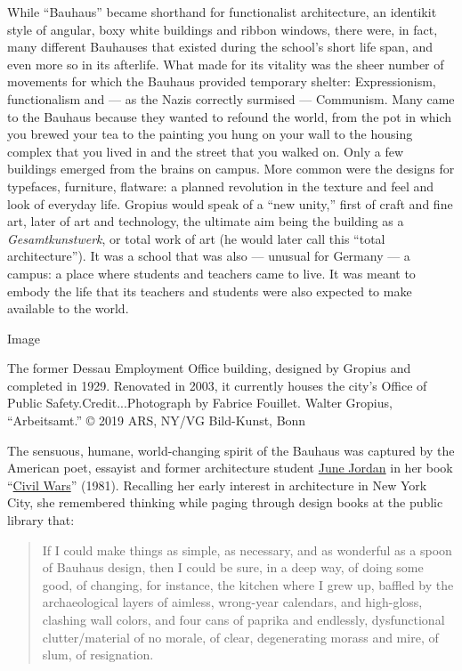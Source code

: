 While ``Bauhaus'' became shorthand for functionalist architecture, an
identikit style of angular, boxy white buildings and ribbon windows,
there were, in fact, many different Bauhauses that existed during the
school's short life span, and even more so in its afterlife. What made
for its vitality was the sheer number of movements for which the Bauhaus
provided temporary shelter: Expressionism, functionalism and --- as the
Nazis correctly surmised --- Communism. Many came to the Bauhaus because
they wanted to refound the world, from the pot in which you brewed your
tea to the painting you hung on your wall to the housing complex that
you lived in and the street that you walked on. Only a few buildings
emerged from the brains on campus. More common were the designs for
typefaces, furniture, flatware: a planned revolution in the texture and
feel and look of everyday life. Gropius would speak of a ``new unity,''
first of craft and fine art, later of art and technology, the ultimate
aim being the building as a \emph{Gesamtkunstwerk}, or total work of art
(he would later call this ``total architecture''). It was a school that
was also --- unusual for Germany --- a campus: a place where students
and teachers came to live. It was meant to embody the life that its
teachers and students were also expected to make available to the world.

Image

The former Dessau Employment Office building, designed by Gropius and
completed in 1929. Renovated in 2003, it currently houses the city's
Office of Public Safety.Credit...Photograph by Fabrice Fouillet. Walter
Gropius, ``Arbeitsamt.'' © 2019 ARS, NY/VG Bild-Kunst, Bonn

The sensuous, humane, world-changing spirit of the Bauhaus was captured
by the American poet, essayist and former architecture student
\href{https://www.nytimes3xbfgragh.onion/2002/06/18/arts/june-jordan-65-poet-and-political-activist.html}{June
Jordan} in her book
``\href{https://www.nytimes3xbfgragh.onion/1981/08/09/books/opinions-and-poems.html}{Civil
Wars}'' (1981). Recalling her early interest in architecture in New York
City, she remembered thinking while paging through design books at the
public library that:

\begin{quote}
If I could make things as simple, as necessary, and as wonderful as a
spoon of Bauhaus design, then I could be sure, in a deep way, of doing
some good, of changing, for instance, the kitchen where I grew up,
baffled by the archaeological layers of aimless, wrong-year calendars,
and high-gloss, clashing wall colors, and four cans of paprika and
endlessly, dysfunctional clutter/material of no morale, of clear,
degenerating morass and mire, of slum, of resignation.
\end{quote}

